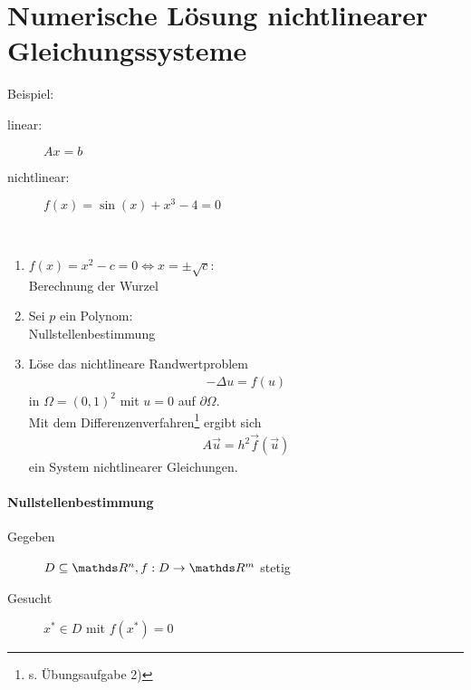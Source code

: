 %
%
%
%


\chapter{Numerische Lösung nichtlinearer Gleichungssysteme}
Beispiel:
\begin{description}
	\item[linear:] $Ax=b$
	\item[nichtlinear:] $f(x) = \sin(x) +x^3-4=0$
\end{description}



\begin{Bspe}~
	\begin{enumerate}[1)]
		\item $f(x) = x^2-c = 0 \Leftrightarrow x= \pm \sqrt{c}$: \\Berechnung der Wurzel
		\item Sei $p$ ein Polynom:\\ Nullstellenbestimmung
		\item Löse das nichtlineare Randwertproblem
		\begin{gather*}
		-\Delta u = f(u)
		\end{gather*}
		in $\Omega=(0,1)^2$ mit $u=0$ auf $\partial \Omega$. \\
		Mit dem Differenzenverfahren\footnote{s. Übungsaufgabe 2)}
		ergibt sich
		\begin{gather*}
		A\vec{u} = h^2 \vec{f}(\vec{u})
		\end{gather*}
		ein System nichtlinearer Gleichungen.
	\end{enumerate}
\end{Bspe}

\subsubsection{Nullstellenbestimmung}
\begin{description}
	\item[Gegeben]   $D\subseteq \R^n, f: D\rightarrow \R^m$ stetig
	\item[Gesucht]    $x^{*}\in D $ mit $f(x^{*}) = 0$
\end{description}

